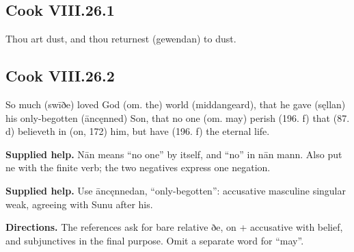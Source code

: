 \par\begin{minipage}{\linewidth}\raggedright
\subsection*{Cook VIII.26.1}

Thou art dust, and thou returnest (gewendan) to dust.

\end{minipage}\par\addvspace{4pt}

\par\begin{minipage}{\linewidth}\raggedright
\subsection*{Cook VIII.26.2}

So much (swīðe) loved God (om. the) world (middangeard), that he gave (sęllan) his only-begotten (āncęnned) Son, that no one (om. may) perish (196. f) that (87. d) believeth in (on, 172) him, but have (196. f) the eternal life.

\end{minipage}\par\addvspace{4pt}

\textbf{Supplied help.} Nān means “no one” by itself, and “no” in nān mann. Also put ne with the finite verb; the two negatives express one negation.

\textbf{Supplied help.} Use āncęnnedan, “only-begotten”: accusative masculine singular weak, agreeing with Sunu after his.

\textbf{Directions.} The references ask for bare relative ðe, on + accusative with belief, and subjunctives in the final purpose. Omit a separate word for “may”.


